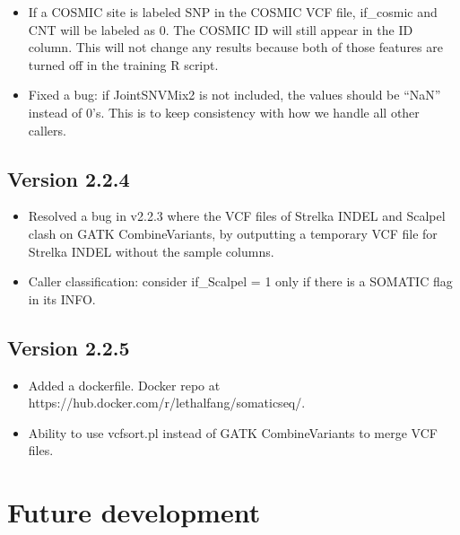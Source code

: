 \documentclass[10pt,letterpaper]{article}
\begin{document}
\begin{sloppypar}
\begin{itemize}
  \item
  If a COSMIC site is labeled SNP in the COSMIC VCF file, if\_cosmic and CNT will be labeled as 0. The COSMIC ID will still appear in the ID column. This will not change any results because both of those features are turned off in the training R script.
  
  \item
  Fixed a bug: if JointSNVMix2 is not included, the values should be ``NaN'' instead of 0's. This is to keep consistency with how we handle all other callers.
  
\end{itemize}



\subsection{Version 2.2.4}

\begin{itemize}

  \item
  Resolved a bug in v2.2.3 where the VCF files of Strelka INDEL and Scalpel clash on GATK CombineVariants, by outputting a temporary VCF file for Strelka INDEL without the sample columns.
  
  \item
  Caller classification: consider if\_Scalpel = 1 only if there is a SOMATIC flag in its INFO. 

\end{itemize}


\subsection{Version 2.2.5}

\begin{itemize}
  
  \item
  Added a dockerfile. Docker repo at https://hub.docker.com/r/lethalfang/somaticseq/. 
  
  \item
  Ability to use vcfsort.pl instead of GATK CombineVariants to merge VCF files.

\end{itemize}




\section{Future development}


\end{sloppypar}
\end{document}
